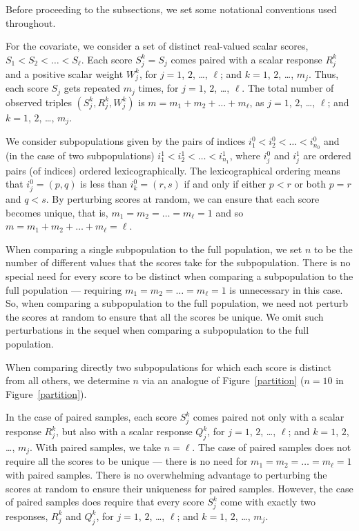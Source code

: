 \documentclass[]{fairmeta}
\begin{document}
Before proceeding to the subsections, we set some notational conventions
used throughout.

For the covariate, we consider a set of distinct real-valued scalar scores,
$S_1 < S_2 < \dots < S_{\ell}$.
Each score $S_j^k = S_j$ comes paired with a scalar response $R_j^k$
and a positive scalar weight $W_j^k$,
for $j = 1$, $2$, \dots, $\ell$; and $k = 1$, $2$, \dots, $m_j$.
Thus, each score $S_j$ gets repeated $m_j$ times,
for $j = 1$, $2$, \dots, $\ell$.
The total number of observed triples $(S_j^k, R_j^k, W_j^k)$
is $m = m_1 + m_2 + \dots + m_{\ell}$,
as $j = 1$, $2$, \dots, $\ell$; and $k = 1$, $2$, \dots, $m_j$.

We consider subpopulations given by the pairs of indices
$i_1^0 < i_2^0 < \dots < i_{n_0}^0$ and
(in the case of two subpopulations)
$i_1^1 < i_2^1 < \dots < i_{n_1}^1$, where $i_j^0$ and $i_j^1$
are ordered pairs (of indices) ordered lexicographically.
The lexicographical ordering means that $i_j^0 = (p, q)$
is less than $i_k^0 = (r, s)$ if and only if
either $p < r$ or both $p = r$ and $q < s$.
By perturbing scores at random, we can ensure that each score becomes unique,
that is, $m_1 = m_2 = \dots = m_{\ell} = 1$
and so $m = m_1 + m_2 + \dots + m_{\ell} = \ell$.

When comparing a single subpopulation to the full population,
we set $n$ to be the number of different values that the scores take
for the subpopulation. There is no special need for every score to be distinct
when comparing a subpopulation to the full population
--- requiring $m_1 = m_2 = \dots = m_{\ell} = 1$ is unnecessary in this case.
So, when comparing a subpopulation to the full population, we need not perturb
the scores at random to ensure that all the scores be unique.
We omit such perturbations in the sequel when comparing a subpopulation
to the full population.

When comparing directly two subpopulations for which each score is distinct
from all others, we determine $n$ via an analogue of Figure~\ref{partition}
($n = 10$ in Figure~\ref{partition}).

In the case of paired samples, each score $S_j^k$ comes paired not only
with a scalar response $R_j^k$, but also with a scalar response $Q_j^k$,
for $j = 1$, $2$, \dots, $\ell$; and $k = 1$, $2$, \dots, $m_j$.
With paired samples, we take $n = \ell$.
The case of paired samples does not require all the scores to be unique
--- there is no need for $m_1 = m_2 = \dots = m_{\ell} = 1$
with paired samples.
There is no overwhelming advantage to perturbing the scores at random
to ensure their uniqueness for paired samples.
However, the case of paired samples does require that every score $S_j^k$
come with exactly two responses, $R_j^k$ and $Q_j^k$,
for $j = 1$, $2$, \dots, $\ell$; and $k = 1$, $2$, \dots, $m_j$.
\end{document}
